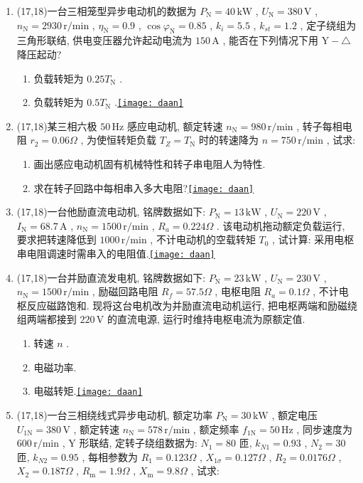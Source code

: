 \documentclass[lang=cn,11pt,marginpar=margintrue]{elegantbook}%
\newcommand{\daan}[1]{\hfill\hyperref[#1]{\texttt{[image: daan]}}}
\newcommand{\zt}[1]{\,\mathrm{#1}}
\newcommand{\NN}{\mathrm{N}}
\begin{document}
\begin{enumerate}
\begin{enumerate}
			\item 电磁功率和电磁转矩.
			\item 轴上输出转矩和空载转矩.
			\item 输入功率和效率.\daan{js:17}
		\end{enumerate}
	\item (17,18)一台三相笼型异步电动机的数据为 $P_{\NN}=40\zt{kW}$ , $U_{\NN}=380\zt{V}$ , $n_{\NN}=2930\zt{r/min}$ , $\eta_{\NN}=0.9$ , $\cos\varphi_{\NN}=0.85$ , $k_i=5.5$ , $k_{st}=1.2$ , 定子绕组为三角形联结, 供电变压器允许起动电流为 $150\zt{A}$ , 能否在下列情况下用 $\mathrm{Y}-\triangle$ 降压起动?
		\begin{enumerate}
			\item 负载转矩为 $0.25T_{\NN}$ .
			\item 负载转矩为 $0.5T_{\NN}$ .\daan{js:18}
		\end{enumerate}
	\item (17,18)某三相六极 $50\zt{Hz}$ 感应电动机, 额定转速 $n_{\NN}=980\zt{r/min}$ , 转子每相电阻 $r_2=0.06\Omega$ , 为使恒转矩负载 $T_Z=T_{\NN}$ 时的转速降为 $n=750\zt{r/min}$ , 试求:
		\begin{enumerate}
			\item 画出感应电动机固有机械特性和转子串电阻人为特性.
			\item 求在转子回路中每相串入多大电阻?\daan{js:19}
		\end{enumerate}
	\item (17,18)一台他励直流电动机, 铭牌数据如下: $P_{\NN}=13\zt{kW}$ , $U_{\NN}=220\zt{V}$ , $I_{\NN}=68.7\zt{A}$ , $n_{\NN}=1500\zt{r/min}$ , $R_a=0.224\Omega$ . 该电动机拖动额定负载运行, 要求把转速降低到 $1000\zt{r/min}$ , 不计电动机的空载转矩 $T_0$ , 试计算: 采用电枢串电阻调速时需串入的电阻值.\daan{js:20}
	\item (17,18)一台并励直流发电机, 铭牌数据如下: $P_{\NN}=23\zt{kW}$ , $U_{\NN}=230\zt{V}$ , $n_{\NN}=1500\zt{r/min}$ , 励磁回路电阻 $R_f=57.5\Omega$ , 电枢电阻 $R_a=0.1\Omega$ , 不计电枢反应磁路饱和. 现将这台电机改为并励直流电动机运行, 把电枢两端和励磁绕组两端都接到 $220\zt{V}$ 的直流电源, 运行时维持电枢电流为原额定值.
		\begin{enumerate}
			\item 转速 $n$ .
			\item 电磁功率.
			\item 电磁转矩.\daan{js:21}
		\end{enumerate}
	\item (17,18)一台三相绕线式异步电动机, 额定功率 $P_{\NN}=30\zt{kW}$ , 额定电压 $U_{1\NN}=380\zt{V}$ , 额定转速 $n_{\NN}=578\zt{r/min}$ , 额定频率 $f_{1\NN}=50\zt{Hz}$ , 同步速度为 $600\zt{r/min}$ , $\mathrm{Y}$ 形联结,  定转子绕组数据为: $N_1=80$ 匝, $k_{N1}=0.93$ , $N_2=30$ 匝, $k_{N2}=0.95$ , 每相参数为 $R_1=0.123\Omega$ , $X_{1\sigma}=0.127\Omega$ , $R_2=0.0176\Omega$ , $X_2=0.187\Omega$ , $R_{\mathrm{m}}=1.9\Omega$ , $X_{\mathrm{m}}=9.8\Omega$ , 试求:

\end{enumerate}
\end{document}
